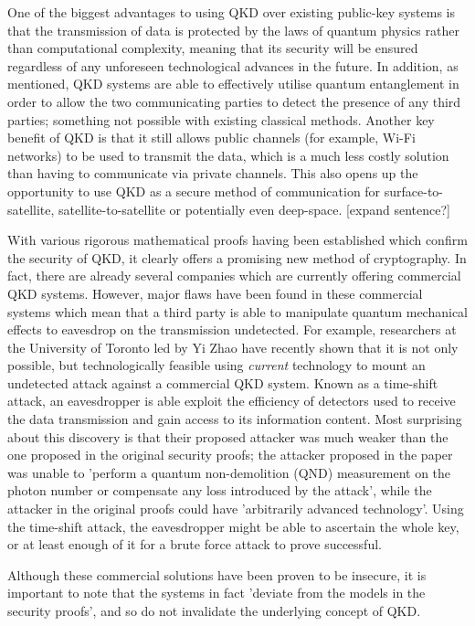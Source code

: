 \documentclass[runningheads,a4paper]{llncs}
\begin{document}
One of the biggest advantages to using QKD over existing public-key systems is that the transmission of data is protected by the laws of quantum physics rather than computational complexity, meaning that its security will be ensured regardless of any unforeseen technological advances in the future. In addition, as mentioned, QKD systems are able to effectively utilise quantum entanglement in order to allow the two communicating parties to detect the presence of any third parties; something not possible with existing classical methods. Another key benefit of QKD is that it still allows public channels (for example, Wi-Fi networks) to be used to transmit the data, which is a much less costly solution than having to communicate via private channels. This also opens up the opportunity to use QKD as a secure method of communication for surface-to-satellite, satellite-to-satellite or potentially even deep-space\cite{Hughes:2000uq}. [expand sentence?]

With various rigorous mathematical proofs having been established which confirm the security of QKD\cite{Deutsch:1996fk}\cite{Shor:2000uq}, it clearly offers a promising new method of cryptography. In fact, there are already several companies which are currently offering commercial QKD systems. However, major flaws have been found in these commercial systems which mean that a third party is able to manipulate quantum mechanical effects to eavesdrop on the transmission undetected\cite{Wiechers:2011fk}\cite{Zhao:2008fk}. For example, researchers at the University of Toronto led by Yi Zhao have recently shown that it is not only possible, but technologically feasible using \emph{current} technology to mount an undetected attack against a commercial QKD system. Known as a time-shift attack, an eavesdropper is able exploit the efficiency of detectors used to receive the data transmission and gain access to its information content. Most surprising about this discovery is that their proposed attacker was much weaker than the one proposed in the original security proofs; the attacker proposed in the paper was unable to 'perform a quantum non-demolition (QND) measurement on the photon number or compensate any loss introduced by the attack', while the attacker in the original proofs could have 'arbitrarily advanced technology'. Using the time-shift attack, the eavesdropper might be able to ascertain the whole key, or at least enough of it for a brute force attack to prove successful. 

Although these commercial solutions have been proven to be insecure, it is important to note that the systems in fact 'deviate from the models in the security proofs'\cite{Lydersen:2010qy}, and so do not invalidate the underlying concept of QKD. 
\end{document}
